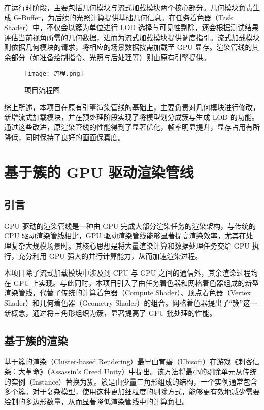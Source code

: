 \par 在运行时阶段，主要包括几何模块与流式加载模块两个核心部分。几何模块负责生成 G-Buffer\cite{lauritzen2010}，为后续的光照计算提供基础几何信息。在任务着色器（Task Shader）中，不仅会以簇为单位进行 LOD 选择与可见性剔除，还会根据测试结果评估当前视角所需的几何数据，进而为流式加载模块提供调度指引。流式加载模块则依据几何模块的请求，将相应的场景数据按需加载至 GPU 显存。渲染管线的其余部分（如准备绘制指令、光照与后处理等）则由原有引擎提供。

\begin{figure}[htbp]
    \centering
    \texttt{[image: 流程.png]}
    \caption{\label{fig:流程}项目流程图}
\end{figure}

\par 综上所述，本项目在原有引擎渲染管线的基础上，主要负责对几何模块进行修改，新增流式加载模块，并在预处理阶段实现了将模型划分成簇与生成 LOD 的功能。通过这些改进，原渲染管线的性能得到了显著优化，帧率明显提升，显存占用有所降低，同时保持了良好的画面保真度。

\section{基于簇的 GPU 驱动渲染管线}

\subsection{引言}

GPU 驱动的渲染管线是一种由 GPU 完成大部分渲染任务的渲染架构，与传统的 CPU 驱动渲染管线相比，GPU 驱动渲染管线能够显著提高渲染效率，尤其在处理复杂大规模场景时。其核心思想是将大量渲染计算和数据处理任务交给 GPU 执行，充分利用 GPU 强大的并行计算能力，从而加速渲染过程。

本项目除了流式加载模块中涉及到 CPU 与 GPU 之间的通信外，其余渲染过程均在 GPU 上实现。与此同时，本项目引入了由任务着色器和网格着色器组成的新型渲染管线，代替了传统的计算着色器（Compute Shader）、顶点着色器（Vertex Shader）和几何着色器（Geometry Shader）的组合。网格着色器提出了“簇”这一新概念，通过将三角形组织为簇，显著提高了 GPU 批处理的性能\cite{Czubala2024}\cite{Santerre2020}。

\subsection{基于簇的渲染}

基于簇的渲染（Cluster-based Rendering）最早由育碧（Ubisoft）在游戏《刺客信条：大革命》（Assassin's Creed Unity）中提出\cite{Ubisoft2015}。该方法将最小的剔除单元从传统的实例（Instance）替换为簇。簇是由少量三角形组成的结构，一个实例通常包含多个簇。对于复杂模型，使用这种更加细粒度的剔除方式，能够更有效地减少需要绘制的多边形数量，从而显著降低渲染管线中的计算负担。

